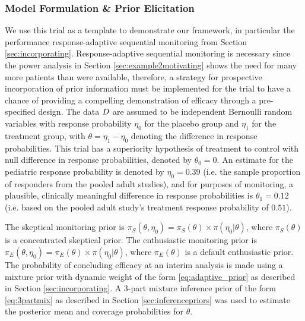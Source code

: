 \documentclass[AMA,STIX1COL,doublespace]{WileyNJD-v2}
\begin{document}
\subsubsection{Model Formulation \& Prior Elicitation}\label{sec:example2model}
We use this trial as a template to demonstrate our framework, in particular the performance response-adaptive sequential monitoring from Section \ref{sec:incorporating}. Response-adaptive sequential monitoring is necessary since the power analysis in Section \ref{sec:example2motivating} shows the need for many more patients than were available, therefore, a strategy for prospective incorporation of prior information must be implemented for the trial to have a chance of providing a compelling demonstration of efficacy through a pre-specified design.
%
The data $\boldmath{D}$ are assumed to be independent Bernoulli random variables with response probability $\eta_0$ for the placebo group and $\eta_1$ for the treatment group, with $\theta=\eta_1-\eta_0$ denoting the difference in response probabilities. 
%
This trial has a superiority hypothesis of treatment to control with null difference in response probabilities, denoted by $\theta_0=0$.
%
An estimate for the pediatric response probability is denoted by $\eta_0=0.39$ (i.e. the sample proportion of responders from the pooled adult studies), and for purposes of monitoring, a plausible, clinically meaningful difference in response probabilities is $\theta_1=0.12$ (i.e. based on the pooled adult study's treatment response probability of $0.51$).%
%


The skeptical monitoring prior is $\pi_S(\theta,\eta_0)=\pi_S(\theta)\times\pi(\eta_0|\theta)$, where $\pi_S(\theta)$ is a concentrated skeptical prior.
%
The enthusiastic monitoring prior is $\pi_E(\theta,\eta_0)=\pi_E(\theta)\times\pi(\eta_0|\theta)$, where $\pi_E(\theta)$ is a default enthusiastic prior.
%
The probability of concluding efficacy at an interim analysis is made using a mixture prior with dynamic weight of the form \eqref{eq:adaptive_prior} as described in Section \ref{sec:incorporating}.
%
A 3-part mixture inference prior of the form \eqref{eq:3partmix} as described in Section \ref{sec:inferencepriors} was used to estimate the posterior mean and coverage probabilities for $\theta$.
%
%
\end{document}
